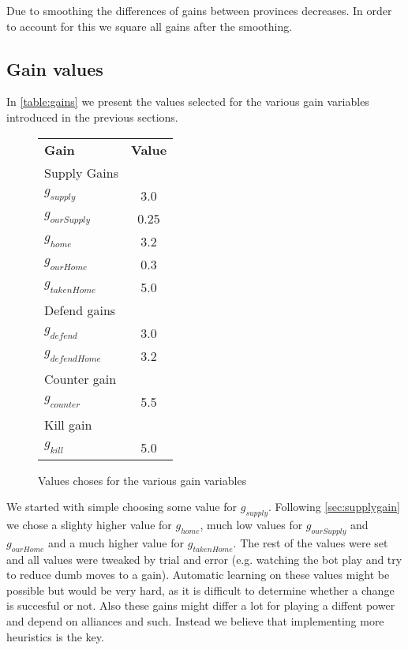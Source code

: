 \documentclass[a4paper]{article} %
\begin{document}
Due to smoothing the differences of gains between provinces decreases. In order to account for this we square all gains after the smoothing. 



\subsection{Gain values}

In \autoref{table:gains} we present the values selected for the various gain variables introduced in the previous sections. 

\begin{figure}[H]
\centering
\begin{tabular}{| l | c |}
  \hline            
  {\bf Gain} & {\bf Value}\\
  {Supply Gains} &  \\
  $g_{supply}$ & 3.0 \\
  $g_{ourSupply}$ & 0.25 \\
  $g_{home}$ & 3.2 \\
  $g_{ourHome}$ & 0.3 \\
  $g_{takenHome}$ & 5.0 \\
  {Defend gains} &  \\
  $g_{defend}$ &  3.0 \\
  $g_{defendHome}$ & 3.2 \\
  {Counter gain} & \\
  $g_{counter}$ & 5.5 \\
  {Kill gain} & \\
  $g_{kill}$ & 5.0 \\
  \hline  
\end{tabular}
\caption{Values choses for the various gain variables}
\label{table:gains}
\end{figure}

We started with simple choosing some value for $g_{supply}$. Following \autoref{sec:supplygain} we chose a slighty higher value for $g_{home}$, much low values for $g_{ourSupply}$ and $g_{ourHome}$ and a much higher value for $g_{takenHome}$. The rest of the values were set and all values were tweaked by trial and error (e.g. watching the bot play and try to reduce dumb moves to a gain). Automatic learning on these values might be possible but would be very hard, as it is difficult to determine whether a change is succesful or not. Also these gains might differ a lot for playing a diffent power and depend on alliances and such. Instead we believe that implementing more heuristics is the key. 
\end{document}
